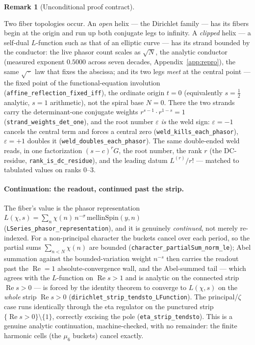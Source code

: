\documentclass[11pt]{article}
\theoremstyle{definition}
\newtheorem{remark}[theorem]{Remark}
\renewcommand{\Re}{\operatorname{Re}}
\begin{document}
\begin{remark}[Unconditional proof contract]
\begin{enumerate}
Two fiber topologies occur. An \emph{open} helix --- the Dirichlet family --- has its fibers begin at
the origin and run up both conjugate legs to infinity. A \emph{clipped} helix --- a self-dual
$L$-function such as that of an elliptic curve --- has its strand bounded by the conductor: the live
phasor count scales as $\sqrt N$, the analytic conductor (measured exponent $0.5000$ across seven
decades, Appendix~\ref{app:repro}), the same $\sqrt{\,\cdot\,}$ law that fixes the abscissa; and its
two legs \emph{meet} at the central point --- the fixed point of the functional-equation involution
(\texttt{affine\_reflection\_fixed\_iff}), the ordinate origin $t=0$ (equivalently
$s=\tfrac12$ analytic, $s=1$ arithmetic), not the spiral base $N=0$. There the two strands carry the
determinant-one conjugate weights $r^{s-1}\!\cdot r^{1-s}=1$ (\texttt{strand\_weights\_det\_one}), and
the root number $\varepsilon$ \emph{is} the weld sign: $\varepsilon=-1$ cancels the central term and
forces a central zero (\texttt{weld\_kills\_each\_phasor}), $\varepsilon=+1$ doubles it
(\texttt{weld\_doubles\_each\_phasor}). The same double-ended weld reads, in one factorization
$(s-c)^r G$, the root number, the rank $r$ (the DC-residue, \texttt{rank\_is\_dc\_residue}), and the
leading datum $L^{(r)}/r!$ --- matched to tabulated values on ranks $0$–$3$.

\paragraph{Continuation: the readout, continued past the strip.} The fiber's value is the phasor
representation $L(\chi,s)=\sum_n\chi(n)\,n^{-\sigma}\,\mathrm{mellinSpin}(y,n)$
(\texttt{LSeries\_phasor\_representation}), and it is genuinely \emph{continued}, not merely
re-indexed. For a non-principal character the buckets cancel over each period, so the partial sums
$\sum_{n<N}\chi(n)$ are bounded (\texttt{character\_partialSum\_norm\_le}); Abel summation against the
bounded-variation weight $n^{-s}$ then carries the readout past the $\Re=1$ absolute-convergence wall,
and the Abel-summed tail --- which agrees with the $L$-function on $\Re s>1$ and is analytic on the
connected strip $\Re s>0$ --- is forced by the identity theorem to converge to $L(\chi,s)$ on the
\emph{whole} strip $\Re s>0$ (\texttt{dirichlet\_strip\_tendsto\_LFunction}). The principal/$\zeta$
case runs identically through the eta regulator on the punctured strip $\{\Re s>0\}\setminus\{1\}$,
correctly excising the pole (\texttt{eta\_strip\_tendsto}). This is a genuine analytic continuation,
machine-checked, with no remainder: the finite harmonic cells (the $\mu_6$ buckets) cancel exactly.


\end{enumerate}
\end{remark}
\end{document}
